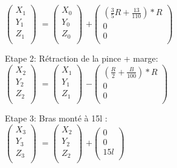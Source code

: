 $
\begin{pmatrix}
  X_{1} \\
  Y_{1} \\
  Z_{1} \\
\end{pmatrix}
$
\vspace{5mm} %
$
=
\begin{pmatrix}
  X_{0} \\
  Y_{0} \\
  Z_{0} \\
\end{pmatrix}
$
\vspace{5mm} %
$
 +
\begin{pmatrix}
 (\frac{3}{5}R + \frac{13}{110})*R  \\
  0 \\
  0 \\
\end{pmatrix}
$

Etape 2: Rétraction de la pince + marge: \\

$
\begin{pmatrix}
  X_{2} \\
  Y_{2} \\
  Z_{2} \\
\end{pmatrix}
$
\vspace{5mm} %
$
=
\begin{pmatrix}
  X_{1} \\
  Y_{1} \\
  Z_{1} \\
\end{pmatrix}
$
\vspace{5mm} %
$
 -
\begin{pmatrix}
 (\frac{R}{2} + \frac{B}{100})*R  \\
  0 \\
  0 \\
\end{pmatrix}
$

Etape 3: Bras monté à 15l : \\

$
\begin{pmatrix}
  X_{3} \\
  Y_{3} \\
  Z_{3} \\
\end{pmatrix}
$
\vspace{5mm} %
$
=
\begin{pmatrix}
  X_{2} \\
  Y_{2} \\
  Z_{2} \\
\end{pmatrix}
$
\vspace{5mm} %
$
 +
\begin{pmatrix}
  0 \\
  0 \\
  15l \\
\end{pmatrix}
$


